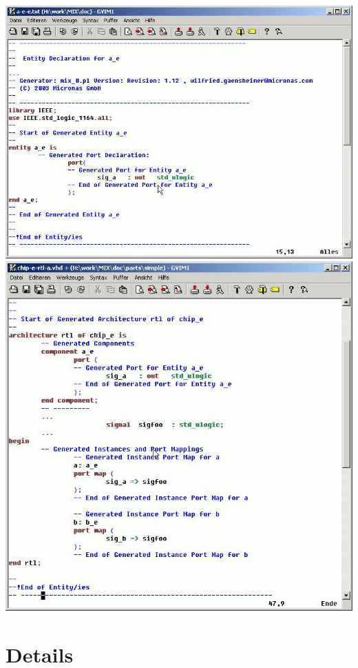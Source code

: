 \documentclass[a4paper,12pt]{article}
\begin{document}
\includegraphics[scale=0.55]{images/mix_a-e-e.jpg}\\
\includegraphics[scale=0.6]{images/mix_chip-e-rtl-a.jpg}\\

\section{Details}
\end{document}
